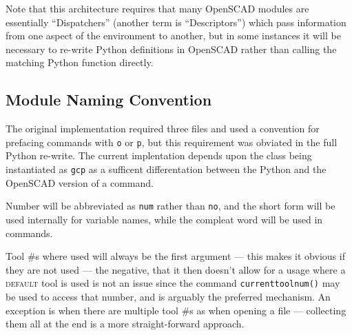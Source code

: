 \documentclass{ltxdoc}
\begin{document}
\noindent Note that this architecture requires that many OpenSCAD modules are essentially ``Dispatchers'' (another term is ``Descriptors'') which pass information from one aspect of the environment to another, but in some instances it will be necessary to re-write Python definitions in OpenSCAD rather than calling the matching Python function directly.

\subsection{Module Naming Convention}

The original implementation required three files and used a convention for prefacing commands with \verb|o| or \verb|p|, but this requirement was obviated in the full Python re-write. The current implentation depends upon the class being instantiated as \verb|gcp| as a sufficent differentation between the Python and the OpenSCAD version of a command.


Number will be abbreviated as \verb|num| rather than \verb|no|, and the short form will be used internally for variable names, while the compleat word will be used in commands.

Tool \#s where used will always be the first argument --- this makes it obvious if they are not used --- the negative, that it then doesn't allow for a usage where a \textsc{default} tool is used is not an issue since the command \verb|currenttoolnum()| may be used to access that number, and is arguably the preferred mechanism. An exception is when there are multiple tool \#s as when opening a file --- collecting them all at the end is a more straight-forward approach.
\end{document}
